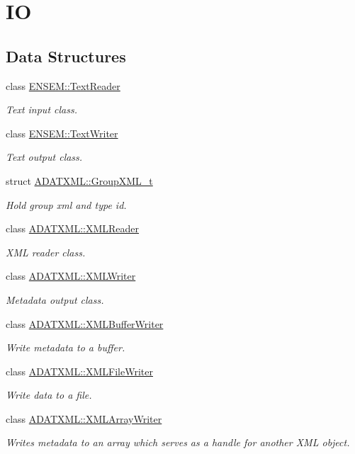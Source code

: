 \hypertarget{group__io}{}\section{IO}
\label{group__io}
\subsection*{Data Structures}
\begin{DoxyCompactItemize}
\item 
class \mbox{\hyperlink{classENSEM_1_1TextReader}{E\+N\+S\+E\+M\+::\+Text\+Reader}}
\begin{DoxyCompactList}\small\item\em Text input class. \end{DoxyCompactList}\item 
class \mbox{\hyperlink{classENSEM_1_1TextWriter}{E\+N\+S\+E\+M\+::\+Text\+Writer}}
\begin{DoxyCompactList}\small\item\em Text output class. \end{DoxyCompactList}\item 
struct \mbox{\hyperlink{structADATXML_1_1GroupXML__t}{A\+D\+A\+T\+X\+M\+L\+::\+Group\+X\+M\+L\+\_\+t}}
\begin{DoxyCompactList}\small\item\em Hold group xml and type id. \end{DoxyCompactList}\item 
class \mbox{\hyperlink{classADATXML_1_1XMLReader}{A\+D\+A\+T\+X\+M\+L\+::\+X\+M\+L\+Reader}}
\begin{DoxyCompactList}\small\item\em X\+ML reader class. \end{DoxyCompactList}\item 
class \mbox{\hyperlink{classADATXML_1_1XMLWriter}{A\+D\+A\+T\+X\+M\+L\+::\+X\+M\+L\+Writer}}
\begin{DoxyCompactList}\small\item\em Metadata output class. \end{DoxyCompactList}\item 
class \mbox{\hyperlink{classADATXML_1_1XMLBufferWriter}{A\+D\+A\+T\+X\+M\+L\+::\+X\+M\+L\+Buffer\+Writer}}
\begin{DoxyCompactList}\small\item\em Write metadata to a buffer. \end{DoxyCompactList}\item 
class \mbox{\hyperlink{classADATXML_1_1XMLFileWriter}{A\+D\+A\+T\+X\+M\+L\+::\+X\+M\+L\+File\+Writer}}
\begin{DoxyCompactList}\small\item\em Write data to a file. \end{DoxyCompactList}\item 
class \mbox{\hyperlink{classADATXML_1_1XMLArrayWriter}{A\+D\+A\+T\+X\+M\+L\+::\+X\+M\+L\+Array\+Writer}}
\begin{DoxyCompactList}\small\item\em Writes metadata to an array which serves as a handle for another X\+ML object. \end{DoxyCompactList}\end{DoxyCompactItemize}
